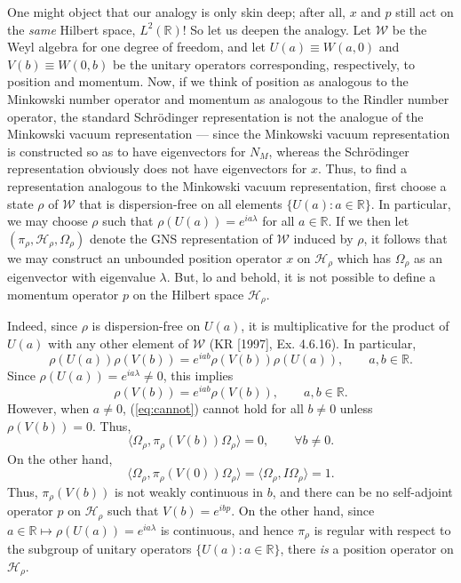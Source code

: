 \documentclass[12pt]{article}
\theoremstyle{remark}
\theoremstyle{definition}
\newcommand{\alg}[1]{\mathcal{#1}}
\newcommand{\hil}[1]{\mathcal{#1}}
\begin{document}
One might object that our analogy is only skin deep; after all, $x$
and $p$ still act on the \emph{same} Hilbert space,
$L^{2}(\mathbb{R})$!  So let us deepen the analogy.  Let $\alg{W}$ be
the Weyl algebra for one degree of freedom, and let $U(a)\equiv
W(a,0)$ and $V(b)\equiv W(0,b)$ be the unitary operators
corresponding, respectively, to position and momentum.  Now, if we
think of position as analogous to the Minkowski number operator and
momentum as analogous to the Rindler number operator, the standard
Schr{\"o}dinger representation is not the analogue of the Minkowski
vacuum representation --- since the Minkowski vacuum representation is
constructed so as to have eigenvectors for $N_{M}$, whereas the
Schr{\"o}dinger representation obviously does not have eigenvectors
for $x$.  Thus, to find a representation analogous to the Minkowski
vacuum representation, first choose a state $\rho$ of $\alg{W}$ that is
dispersion-free on all elements $\{ U(a):a\in \mathbb{R} \}$.  In
particular, we may choose $\rho$ such that $\rho (U(a))=e^{ia\lambda
  }$ for all $a \in \mathbb{R}$.  If we then let
$(\pi_{\rho},\hil{H}_{\rho},\Omega_{\rho})$ denote the GNS
representation of $\alg{W}$ induced by $\rho$, it follows that we may
construct an unbounded position operator $x$ on $\hil{H}_{\rho}$ which
has $\Omega_{\rho}$ as an eigenvector with eigenvalue $\lambda$.  But,
lo and behold, it is not possible to define a momentum operator $p$ on
the Hilbert space $\hil{H}_{\rho}$.

Indeed, since $\rho$ is dispersion-free on $U(a)$, it is
multiplicative for the product of $U(a)$ with any other element of
$\alg{W}$ (KR [1997], Ex. 4.6.16).  In particular,
\begin{equation} 
\rho(U(a))\rho(V(b))=
  e^{iab}\rho(V(b))\rho(U(a)),\qquad a,b\in \mathbb{R}.
\end{equation}
Since $\rho(U(a))=e^{ia\lambda}\not=0$, this implies
\begin{equation} 
\rho(V(b))=e^{iab}\rho(V(b)),\qquad a,b\in \mathbb{R}. \label{eq:cannot}
\end{equation}
However, when $a\not=0$, (\ref{eq:cannot}) cannot hold for all
$b\not=0$ unless $\rho(V(b))=0$.  Thus, 
\begin{equation}
\langle\Omega_{\rho},\pi_{\rho}(V(b)) \Omega_{\rho}\rangle=0,\qquad \forall b\not=0.
\end{equation}
On the other hand,
\begin{equation}
\langle\Omega_{\rho},\pi_{\rho}(V(0))\Omega_{\rho}\rangle 
=\langle\Omega_{\rho}, I\Omega_{\rho}\rangle=1.
\end{equation}
Thus, $\pi_{\rho}(V(b))$ is not weakly continuous in $b$, 
and there can be no self-adjoint operator $p$ on 
$\hil{H}_{\rho}$ such that $V(b)=e^{ibp}$.   On the other hand, 
since $a\in \mathbb{R}\mapsto \rho(U(a))=e^{ia\lambda}$ is continuous, and 
hence $\pi_{\rho}$ is regular with respect to the subgroup of unitary 
operators $\{U(a):a\in \mathbb{R}\}$, there \emph{is} a position operator 
on $\hil{H}_{\rho}$.   
\end{document}
